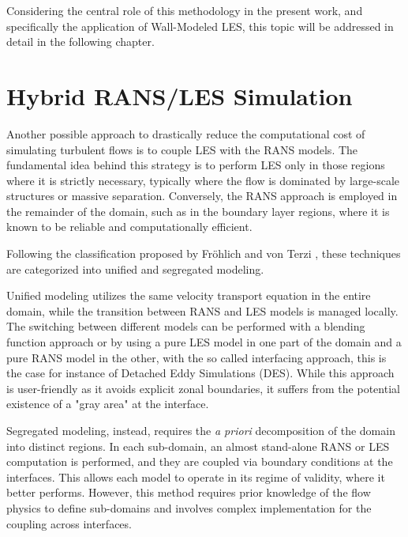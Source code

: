 \documentclass[12pt, a4paper, twoside, openright]{book}
\begin{document}
Considering the central role of this methodology in the present work, and specifically the application of Wall-Modeled LES, this topic will be addressed in detail in the following chapter.

\section{Hybrid RANS/LES Simulation}
Another possible approach to drastically reduce the computational cost of simulating turbulent flows is to couple LES with the RANS models. The fundamental idea behind this strategy is to perform LES only in those regions where it is strictly necessary, typically where the flow is dominated by large-scale structures or massive separation. Conversely, the RANS approach is employed in the remainder of the domain, such as in the boundary layer regions, where it is known to be reliable and computationally efficient.

Following the classification proposed by Fröhlich and von Terzi \cite{urans-hybrid}, these techniques are categorized into unified and segregated modeling.

Unified modeling utilizes the same velocity transport equation in the entire domain, while the transition between RANS and LES models is managed locally. The switching between different models can be performed with a blending function approach or by using a pure LES model in one part of the domain and a pure RANS model in the other, with the so called interfacing approach, this is the case for instance of Detached Eddy Simulations (DES). While this approach is user-friendly as it avoids explicit zonal boundaries, it suffers from the potential existence of a "gray area" at the interface.

Segregated modeling, instead, requires the \textit{a priori} decomposition of the domain into distinct regions. In each sub-domain, an almost stand-alone RANS or LES computation is performed, and they are coupled via boundary conditions at the interfaces. This allows each model to operate in its regime of validity, where it better performs. However, this method requires prior knowledge of the flow physics to define sub-domains and involves complex implementation for the coupling across interfaces.
\end{document}
